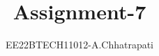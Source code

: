\documentclass[journal,12pt,twocolumn]{IEEEtran}
\theoremstyle{remark}
\begin{document}
%




\vspace{3cm}

\title{
Assignment-7
}
\author{EE22BTECH11012-A.Chhatrapati}


\maketitle

\newpage


\bigskip

\renewcommand{\thefigure}{\theenumi}
\renewcommand{\thetable}{\theenumi}


\providecommand{\pr}[1]{\ensuremath{\Pr\left(#1\right)}}
\providecommand{\prt}[2]{\ensuremath{p_{#1}^{\left(#2\right)} }}        %
\providecommand{\qfunc}[1]{\ensuremath{Q\left(#1\right)}}
\providecommand{\sbrak}[1]{\ensuremath{{}\left[#1\right]}}
\providecommand{\lsbrak}[1]{\ensuremath{{}\left[#1\right.}}
\providecommand{\rsbrak}[1]{\ensuremath{{}\left.#1\right]}}
\providecommand{\brak}[1]{\ensuremath{\left(#1\right)}}
\providecommand{\lbrak}[1]{\ensuremath{\left(#1\right.}}
\providecommand{\rbrak}[1]{\ensuremath{\left.#1\right)}}
\providecommand{\cbrak}[1]{\ensuremath{\left\{#1\right\}}}
\providecommand{\lcbrak}[1]{\ensuremath{\left\{#1\right.}}
\providecommand{\rcbrak}[1]{\ensuremath{\left.#1\right\}}}
\newcommand{\sgn}{\mathop{\mathrm{sgn}}}
\providecommand{\abs}[1]{\left\vert#1\right\vert}
\providecommand{\res}[1]{\Res\displaylimits_{#1}} 
\providecommand{\norm}[1]{\left\lVert#1\right\rVert}
\providecommand{\mtx}[1]{\mathbf{#1}}
\providecommand{\mean}[1]{E\left[ #1 \right]}
\providecommand{\cond}[2]{#1\middle|#2}
\providecommand{\fourier}{\overset{\mathcal{F}}{ \rightleftharpoons}}
\newenvironment{amatrix}[1]{%
  \left(\begin{array}{@{}*{#1}{c}|c@{}}
}{%
  \end{array}\right)
}
\end{document}
